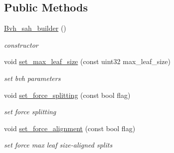 \subsection*{Public Methods}
\begin{DoxyCompactItemize}
\item 
\mbox{\label{classcugar_1_1deprecated_1_1_bvh__sah__builder_aa5fdf97afb1c4cca39a80f0a115ba2f0}} 
\hyperlink{classcugar_1_1deprecated_1_1_bvh__sah__builder_aa5fdf97afb1c4cca39a80f0a115ba2f0}{Bvh\+\_\+sah\+\_\+builder} ()
\begin{DoxyCompactList}\small\item\em constructor \end{DoxyCompactList}\item 
\mbox{\label{classcugar_1_1deprecated_1_1_bvh__sah__builder_a32133e57e327a095abc813f631707e16}} 
void \hyperlink{classcugar_1_1deprecated_1_1_bvh__sah__builder_a32133e57e327a095abc813f631707e16}{set\+\_\+max\+\_\+leaf\+\_\+size} (const uint32 max\+\_\+leaf\+\_\+size)
\begin{DoxyCompactList}\small\item\em set bvh parameters \end{DoxyCompactList}\item 
\mbox{\label{classcugar_1_1deprecated_1_1_bvh__sah__builder_aa6a733904080f3eb8c72f4834dbaf095}} 
void \hyperlink{classcugar_1_1deprecated_1_1_bvh__sah__builder_aa6a733904080f3eb8c72f4834dbaf095}{set\+\_\+force\+\_\+splitting} (const bool flag)
\begin{DoxyCompactList}\small\item\em set force splitting \end{DoxyCompactList}\item 
\mbox{\label{classcugar_1_1deprecated_1_1_bvh__sah__builder_a7c573483142a10f96dff93700a4aff27}} 
void \hyperlink{classcugar_1_1deprecated_1_1_bvh__sah__builder_a7c573483142a10f96dff93700a4aff27}{set\+\_\+force\+\_\+alignment} (const bool flag)
\begin{DoxyCompactList}\small\item\em set force \textquotesingle{}max leaf size\textquotesingle{}-\/aligned splits \end{DoxyCompactList}\item 

\end{DoxyCompactItemize}
